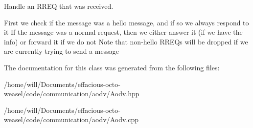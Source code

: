 Handle an R\+R\+EQ that was received. 

First we check if the message was a hello message, and if so we always respond to it If the message was a normal request, then we either answer it (if we have the info) or forward it if we do not Note that non-\/hello R\+R\+E\+Qs will be dropped if we are currently trying to send a message 

The documentation for this class was generated from the following files\+:\begin{DoxyCompactItemize}
\item 
/home/will/\+Documents/effacious-\/octo-\/weasel/code/communication/aodv/Aodv.\+hpp\item 
/home/will/\+Documents/effacious-\/octo-\/weasel/code/communication/aodv/Aodv.\+cpp\end{DoxyCompactItemize}
